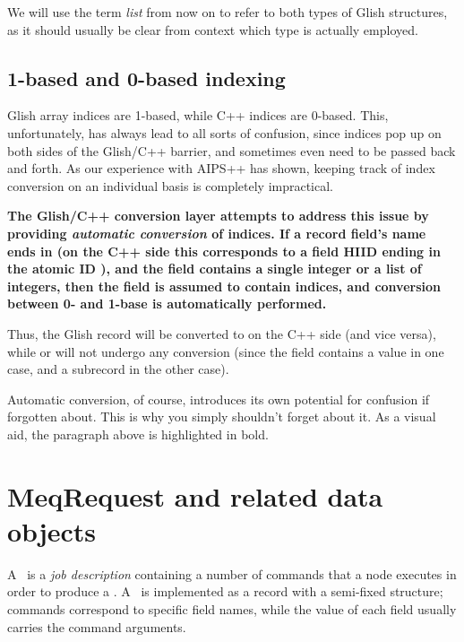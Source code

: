 \documentclass[10pt,twoside]{book}
\begin{document}
  We will use the term {\em list} from now on to refer to both types of Glish
  structures, as it should usually be clear from context which type is actually
  employed.


\subsection{1-based and 0-based indexing}
  \label{sec:indexconv}

  Glish array indices are 1-based, while C++ indices are 0-based. This,
  unfortunately, has always lead to all sorts of confusion, since indices pop
  up on both sides of the Glish/C++ barrier, and sometimes even need to be
  passed back and forth. As our experience with AIPS++ has shown, keeping track
  of index conversion on an individual basis is completely impractical.

  {\bf The Glish/C++ conversion layer attempts to address this issue by
  providing {\em automatic conversion} of indices. If a record field's name
  ends in  (on the C++ side this corresponds to a field HIID ending
  in the atomic ID ), and the field contains a single integer or a
  list of integers, then the field is assumed to contain indices, and
  conversion between 0- and 1-base is automatically performed.}

  Thus, the Glish record \qq{[foo=1,foo\_index=1,bar\_index=[2,3]]} will be
  converted to \qq{[Foo=1,Foo.Index=0,Bar.Index=[1,2]]} on the C++ side (and
  vice versa), while \qq{[foo\_index=1.0]} or \qq{[foo\_index=[a=1,b=2]]} will
  not undergo any conversion (since the  field contains a
   value in one case, and a subrecord in the other case).

  Automatic conversion, of course, introduces its own potential for confusion
  if forgotten about. This is why you simply shouldn't forget about it. As a
  visual aid, the paragraph above is highlighted in bold.

\section{MeqRequest and related data objects}

  A \Request\ is a {\em job description} containing a number of commands that a
  node executes in order to produce a \Result. A \Request\ is implemented as a
  record with a semi-fixed structure; commands correspond to specific field 
  names, while the value of each field usually carries the command arguments.
  
\end{document}
